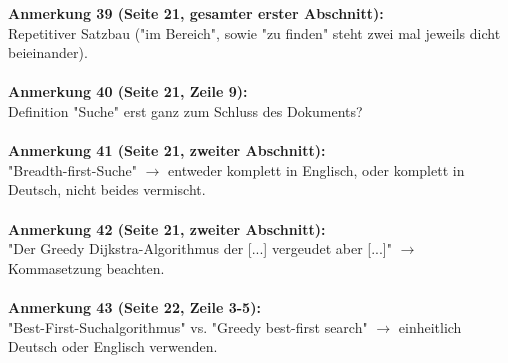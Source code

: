 \documentclass[a4paper,12pt]{book}
\begin{document}
\noindent
\textbf{Anmerkung 39 (Seite 21, gesamter erster Abschnitt):}\\
Repetitiver Satzbau ("im Bereich", sowie "zu finden" steht zwei mal jeweils dicht beieinander). \\
\\

\noindent
\textbf{Anmerkung 40 (Seite 21, Zeile 9):}\\
Definition "Suche" erst ganz zum Schluss des Dokuments? \\
\\

\noindent
\textbf{Anmerkung 41 (Seite 21, zweiter Abschnitt):}\\
"Breadth-first-Suche" $\rightarrow$ entweder komplett in Englisch, oder komplett in Deutsch, nicht beides vermischt. \\
\\

\noindent
\textbf{Anmerkung 42 (Seite 21, zweiter Abschnitt):}\\
"Der Greedy Dijkstra-Algorithmus der [...] vergeudet aber [...]" $\rightarrow$ Kommasetzung beachten. \\
\\

\noindent
\textbf{Anmerkung 43 (Seite 22, Zeile 3-5):}\\
"Best-First-Suchalgorithmus" vs. "Greedy best-first search" $\rightarrow$ einheitlich Deutsch oder Englisch verwenden. \\
\\
\end{document}
